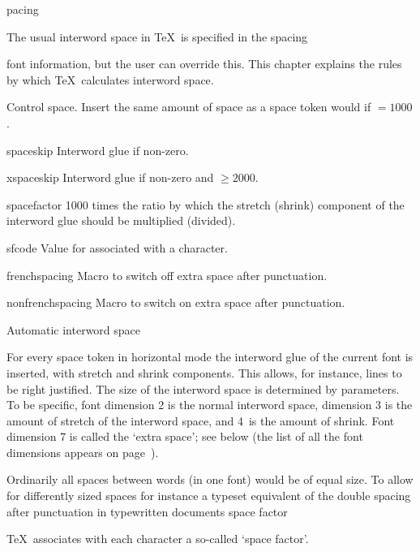 \subject[space] Spacing

The usual interword space in \TeX\ is specified in the
\term spacing\par
font information, but the user can override this.
This chapter explains the rules by which
\TeX\ calculates interword space.

\invent

\item {}
      Control space.
      Insert the same amount of space as a space token would
      if ${}=1000$.

\item spaceskip 
      Interword glue if non-zero.

\item xspaceskip 
      Interword glue if non-zero and ${}\geq2000$.

\item spacefactor 
      1000 times the ratio by which the stretch (shrink) component of the
      interword glue should be multiplied (divided).

\item sfcode 
      Value for  associated with a character.

\item frenchspacing
      Macro to switch off extra space after punctuation.

\item nonfrenchspacing
      Macro to switch on extra space after punctuation.

\inventstop


\point Automatic interword space


For every space token in horizontal mode the interword glue
of the current font
is inserted, with stretch and shrink components.
This allows, for instance, lines to be right justified.
The size of the
interword space is determined by  parameters.
To be specific, font dimension 2 is the normal interword space,
dimension 3 is the amount of stretch of the interword
space, and 4~is the amount of shrink. Font dimension
7 is called the `extra space'; see below (the list
of all the font dimensions appears on page~). 

Ordinarily all spaces between words (in one font) would be of
equal size. To allow for differently sized spaces \ldash for instance
a typeset equivalent of the double spacing after
punctuation in typewritten documents \rdash
\term space factor\par
\TeX\ associates with each character a so-called `space factor'.

